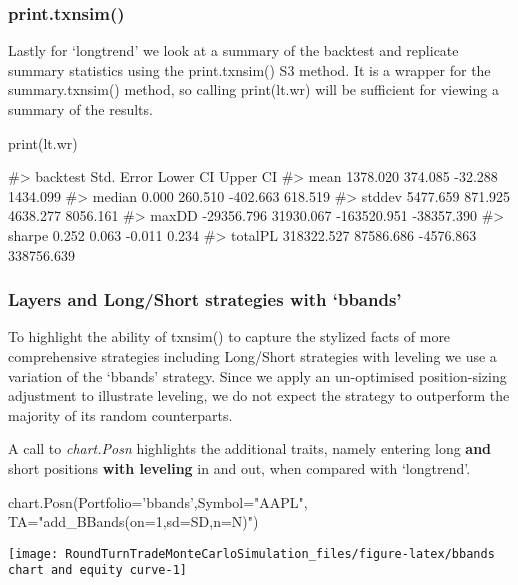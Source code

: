 \hypertarget{print.txnsim}{%
\subsubsection{print.txnsim()}\label{print.txnsim}}

Lastly for `longtrend' we look at a summary of the backtest and
replicate summary statistics using the print.txnsim() S3 method. It is a
wrapper for the summary.txnsim() method, so calling print(lt.wr) will be
sufficient for viewing a summary of the results.

\begin{Schunk}
\begin{Sinput}
print(lt.wr)
\end{Sinput}
\begin{Soutput}
#>           backtest Std. Error    Lower CI   Upper CI
#> mean      1378.020    374.085     -32.288   1434.099
#> median       0.000    260.510    -402.663    618.519
#> stddev    5477.659    871.925    4638.277   8056.161
#> maxDD   -29356.796  31930.067 -163520.951 -38357.390
#> sharpe       0.252      0.063      -0.011      0.234
#> totalPL 318322.527  87586.686   -4576.863 338756.639
\end{Soutput}
\end{Schunk}

\hypertarget{layers-and-longshort-strategies-with-bbands}{%
\subsubsection{Layers and Long/Short strategies with
`bbands'}\label{layers-and-longshort-strategies-with-bbands}}

To highlight the ability of txnsim() to capture the stylized facts of
more comprehensive strategies including Long/Short strategies with
leveling we use a variation of the `bbands' strategy. Since we apply an
un-optimised position-sizing adjustment to illustrate leveling, we do
not expect the strategy to outperform the majority of its random
counterparts.

A call to \emph{chart.Posn} highlights the additional traits, namely
entering long \textbf{and} short positions \textbf{with leveling} in and
out, when compared with `longtrend'.

\begin{Schunk}
\begin{Sinput}
chart.Posn(Portfolio='bbands',Symbol="AAPL",
           TA="add_BBands(on=1,sd=SD,n=N)")
\end{Sinput}


\begin{center}\texttt{[image: RoundTurnTradeMonteCarloSimulation\_files/figure-latex/bbands chart and equity curve-1]} \end{center}

\end{Schunk}

